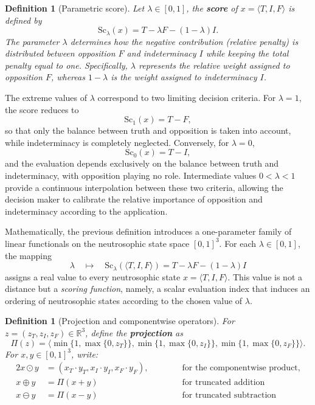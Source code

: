 \documentclass[11pt,a4paper]{article}
\newtheorem{definition}[theorem]{Definition}
\newcommand{\nstriple}[1]{\langle #1 \rangle}
\newcommand{\R}{\mathbb{R}}
\newcommand{\score}{\mathrm{Sc}}
\newcommand{\Score}[2][]{\score_{#1}\!\left(#2\right)}
\begin{document}
	\begin{definition}[Parametric score]
		Let $\lambda \in [0,1]$, the \textbf{score} of $ x = \nstriple{T,I,F}$ is defined by
		\begin{equation}\label{eq:score}
			\Score[\lambda]{x} = T - \lambda F - ( 1 - \lambda) I.
		\end{equation}
		The parameter $\lambda$ determines how the negative contribution (relative penalty) is distributed between opposition $F$ and indeterminacy $I$ while keeping the total penalty equal to one. Specifically, $\lambda$ represents the relative weight assigned to opposition $F$, whereas $1-\lambda$ is the weight assigned to indeterminacy $I$.
	\end{definition}
	
	The extreme values of $\lambda$ correspond to two limiting decision criteria. For $\lambda = 1$, the score reduces to
	$$
	\Score[1]{x} = T - F,
	$$
	so that only the balance between truth and opposition is taken into account, while indeterminacy is completely neglected. Conversely, for $\lambda = 0$,
	$$
	\Score[0]{x} = T - I,
	$$
	and the evaluation depends exclusively on the balance between truth and indeterminacy, with opposition playing no role. 
	Intermediate values $0<\lambda<1$ provide a continuous interpolation between these two criteria, allowing the decision maker to calibrate the relative importance of opposition and indeterminacy according to the application.
	
	Mathematically, the previous definition introduces a one-parameter family of linear functionals on the neutrosophic state space $[0,1]^3$. For each $\lambda\in[0,1]$, the mapping
	$$
	\lambda \quad \longmapsto \quad \Score[\lambda]{\nstriple{T,I,F}} = T - \lambda F - (1 - \lambda)I
	$$
	assigns a real value to every neutrosophic state $x = \nstriple{T,I,F}$. This value is not a distance but a \emph{scoring function}, namely, a scalar evaluation index that induces an ordering of neutrosophic states according to the chosen value of $\lambda$.

	\begin{definition}[Projection and componentwise operators]
		For $z=(z_T,z_I,z_F)\in\R^3$, define the \textbf{projection} as
		$$ 
		\Pi(z) = \nstriple{ \min\{1,\max\{0,z_T\}\}, \min\{1,\max\{0,z_I\}\}, \min\{1,\max\{0,z_F\}\}}.
		$$
		For $x,y\in[0,1]^3$, write:
		\begin{alignat*}{2}
			x \odot y &= (x_T\cdot y_T, x_I\cdot y_I, x_F\cdot y_F), &\qquad& \text{ for the componentwise product}, \\
			x \oplus y &= \Pi(x+y) &\qquad& \text{ for truncated addition} \\
			x \ominus y &= \Pi(x-y) &\qquad& \text{ for truncated subtraction}
		\end{alignat*}
	\end{definition}
	
\end{document}

